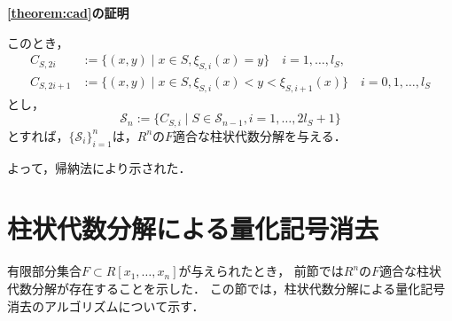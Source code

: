 \documentclass[uplatex, dvipdfmx]{jsarticle}
\makeatletter
\numberwithin{equation}{section}
\renewenvironment{proof}[1][\proofname]{\par
  \pushQED{\qed}%
  \normalfont \topsep6\p@\@plus6\p@\relax
  \trivlist
  \item\relax
  {\bfseries
  #1\@addpunct{.}}\hspace\labelsep\ignorespaces
}{
  \popQED\endtrivlist\@endpefalse
}
\newcommand{\R}{\mathbb{R}}
\newcommand{\Qua}{\mathfrak{Q}}
\newcommand{\calS}{\mathcal{S}}
\theoremstyle{definition}
\newtheorem{definition}{定義}[section]
\renewcommand{\proofname}{\textbf{証明}}
\makeatother
\begin{document}
\begin{proof}[\cref{theorem:cad}の証明]
     このとき，
     \begin{align}
          C_{S,2i} &:= \{(x,y) \mid  x \in S, \xi_{S,i}(x) = y \} \quad i = 1,\dots, l_S,\\
          C_{S,2i+1} &:= \{(x,y) \mid x \in S, \xi_{S,i}(x)<y<\xi_{S,i+1}(x) \} \quad i = 0,1, \dots, l_S 
     \end{align}
     とし，
     \begin{equation}
          \calS_n := \{C_{S,i} \mid S \in \calS_{n-1}, i=1, \dots, 2l_S+1\}
     \end{equation}
     とすれば，$\{\calS_i\}_{i=1}^n$は，$R^n$の$F$適合な柱状代数分解を与える．

     よって，帰納法により示された．
\end{proof}




\section{柱状代数分解による量化記号消去}

有限部分集合$F \subset R[x_1, \dots, x_n]$が与えられたとき，
前節では$R^n$の$F$適合な柱状代数分解が存在することを示した．
この節では，柱状代数分解による量化記号消去のアルゴリズムについて示す．

\end{document}
